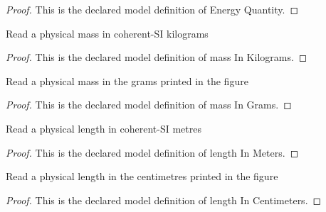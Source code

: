 \begin{proof}
  This is the declared model definition of Energy Quantity.
\end{proof}
\begin{definition}
  \label{def:physics:phyx-mini-0698:phyxminiproblems-problemphyxmini0698-massinkilograms}
  Read a physical mass in coherent-SI kilograms
\end{definition}
\begin{proof}
  This is the declared model definition of mass In Kilograms.
\end{proof}
\begin{definition}
  \label{def:physics:phyx-mini-0698:phyxminiproblems-problemphyxmini0698-massingrams}
  Read a physical mass in the grams printed in the figure
\end{definition}
\begin{proof}
  This is the declared model definition of mass In Grams.
\end{proof}
\begin{definition}
  \label{def:physics:phyx-mini-0698:phyxminiproblems-problemphyxmini0698-lengthinmeters}
  Read a physical length in coherent-SI metres
\end{definition}
\begin{proof}
  This is the declared model definition of length In Meters.
\end{proof}
\begin{definition}
  \label{def:physics:phyx-mini-0698:phyxminiproblems-problemphyxmini0698-lengthincentimeters}
  Read a physical length in the centimetres printed in the figure
\end{definition}
\begin{proof}
  This is the declared model definition of length In Centimeters.
\end{proof}

